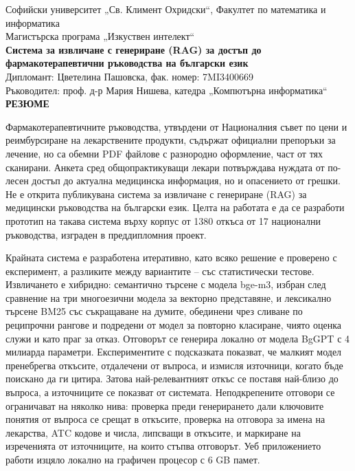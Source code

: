\documentclass[12pt,a4paper]{article}
\begin{document}
\begin{center}
{\small Софийски университет „Св. Климент Охридски“, Факултет по математика и информатика\\
Магистърска програма „Изкуствен интелект“}\\[0.8em]
{\large\bfseries Система за извличане с генериране (RAG) за достъп до\\ фармакотерапевтични ръководства на български език}\\[0.6em]
Дипломант: Цветелина Пашовска, фак. номер: 7MI3400669\\[0.8em]
Ръководител: проф. д-р Мария Нишева, катедра „Компютърна информатика“ \\[0.8em]
{\bfseries РЕЗЮМЕ}
\end{center}

Фармакотерапевтичните ръководства, утвърдени от Националния съвет по цени и реимбурсиране на лекарствените продукти, съдържат официални препоръки за лечение, но са обемни PDF файлове с разнородно оформление, част от тях сканирани. Анкета сред общопрактикуващи лекари потвърждава нуждата от по-лесен достъп до актуална медицинска информация, но и опасението от грешки. Не е открита публикувана система за извличане с генериране (RAG) за медицински ръководства на български език. Целта на работата е да се разработи прототип на такава система върху корпус от 1380 откъса от 17 национални ръководства, изграден в преддипломния проект.

Крайната система е разработена итеративно, като всяко решение е проверено с експеримент, а разликите между вариантите -- със статистически тестове. Извличането е хибридно: семантично търсене с модела bge-m3, избран след сравнение на три многоезични модела за векторно представяне, и лексикално търсене BM25 със съкращаване на думите, обединени чрез сливане по реципрочни рангове и подредени от модел за повторно класиране, чиято оценка служи и като праг за отказ. Отговорът се генерира локално от модела BgGPT с 4 милиарда параметри. Експериментите с подсказката показват, че малкият модел пренебрегва откъсите, отдалечени от въпроса, и измисля източници, когато бъде поискано да ги цитира. Затова най-релевантният откъс се поставя най-близо до въпроса, а източниците се показват от системата. Неподкрепените отговори се ограничават на няколко нива: проверка преди генерирането дали ключовите понятия от въпроса се срещат в откъсите, проверка на отговора за имена на лекарства, ATC кодове и числа, липсващи в откъсите, и маркиране на изреченията от източниците, на които стъпва отговорът. Уеб приложението работи изцяло локално на графичен процесор с 6 GB памет.
\end{document}
